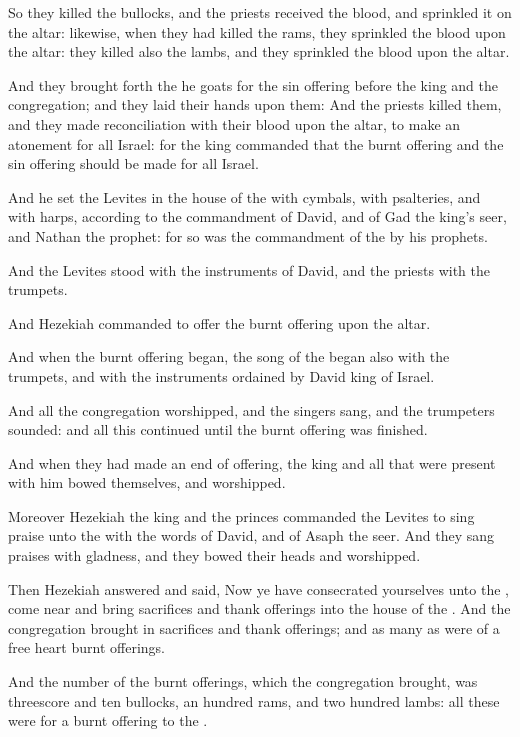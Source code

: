 \Verse So they killed the bullocks, and the priests received the blood, and sprinkled it on the altar: likewise, when they had killed the rams, they sprinkled the blood upon the altar: they killed also the lambs, and they sprinkled the blood upon the altar.

\Verse And they brought forth the he goats for the sin offering before the king and the congregation; and they laid their hands upon them: \Verse And the priests killed them, and they made reconciliation with their blood upon the altar, to make an atonement for all Israel: for the king commanded that the burnt offering and the sin offering should be made for all Israel.

\Verse And he set the Levites in the house of the \LORD with cymbals, with psalteries, and with harps, according to the commandment of David, and of Gad the king's seer, and Nathan the prophet: for so was the commandment of the \LORD by his prophets.

\Verse And the Levites stood with the instruments of David, and the priests with the trumpets.

\Verse And Hezekiah commanded to offer the burnt offering upon the altar.

And when the burnt offering began, the song of the \LORD began also with the trumpets, and with the instruments ordained by David king of Israel.

\Verse And all the congregation worshipped, and the singers sang, and the trumpeters sounded: and all this continued until the burnt offering was finished.

\Verse And when they had made an end of offering, the king and all that were present with him bowed themselves, and worshipped.

\Verse Moreover Hezekiah the king and the princes commanded the Levites to sing praise unto the \LORD with the words of David, and of Asaph the seer. And they sang praises with gladness, and they bowed their heads and worshipped.

\Verse Then Hezekiah answered and said, Now ye have consecrated yourselves unto the \LORD, come near and bring sacrifices and thank offerings into the house of the \LORD. And the congregation brought in sacrifices and thank offerings; and as many as were of a free heart burnt offerings.

\Verse And the number of the burnt offerings, which the congregation brought, was threescore and ten bullocks, an hundred rams, and two hundred lambs: all these were for a burnt offering to the \LORD.

